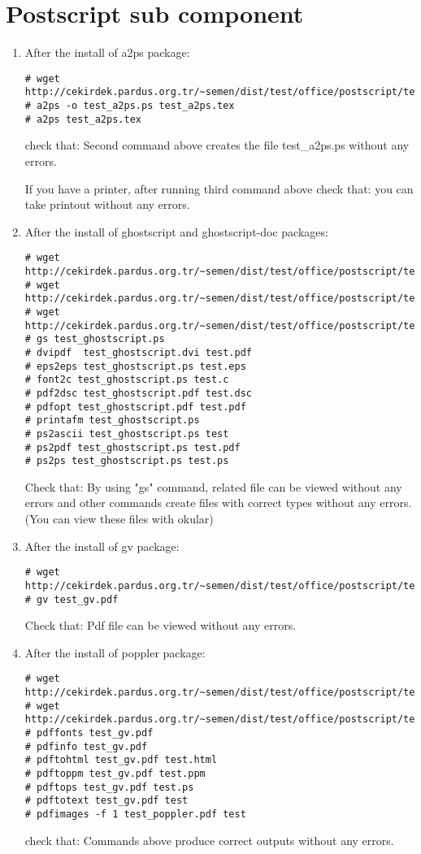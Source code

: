 \documentclass[a4paper,10pt]{article}
\begin{document}
\section{ Postscript sub component}
\begin{enumerate}
\item After the install of a2ps package:
\begin{verbatim}
# wget http://cekirdek.pardus.org.tr/~semen/dist/test/office/postscript/test_a2ps.tex
# a2ps -o test_a2ps.ps test_a2ps.tex
# a2ps test_a2ps.tex
\end{verbatim}

check that: Second command above creates the file test\_a2ps.ps without any errors.

If you have a printer, after running third command above  check that: you can take printout without any errors.

\item After the install of ghostscript and ghostscript-doc packages:
\begin{verbatim}
# wget http://cekirdek.pardus.org.tr/~semen/dist/test/office/postscript/test_ghostscript.ps
# wget http://cekirdek.pardus.org.tr/~semen/dist/test/office/postscript/test_ghostscript.dvi
# wget http://cekirdek.pardus.org.tr/~semen/dist/test/office/postscript/test_ghostscript.pdf
# gs test_ghostscript.ps
# dvipdf  test_ghostscript.dvi test.pdf
# eps2eps test_ghostscript.ps test.eps
# font2c test_ghostscript.ps test.c
# pdf2dsc test_ghostscript.pdf test.dsc
# pdfopt test_ghostscript.pdf test.pdf
# printafm test_ghostscript.ps
# ps2ascii test_ghostscript.ps test
# ps2pdf test_ghostscript.ps test.pdf
# ps2ps test_ghostscript.ps test.ps
\end{verbatim}

Check that: By using "gs" command, related file can be viewed without any errors and other commands create files with correct types without any errors. (You can view these files with okular)

\item After the install of gv package:
\begin{verbatim}
# wget http://cekirdek.pardus.org.tr/~semen/dist/test/office/postscript/test_gv.pdf
# gv test_gv.pdf
\end{verbatim}

Check that: Pdf file can be viewed without any errors.

\item After the install of poppler package:
\begin{verbatim}
# wget http://cekirdek.pardus.org.tr/~semen/dist/test/office/postscript/test_gv.pdf
# wget http://cekirdek.pardus.org.tr/~semen/dist/test/office/postscript/test_poppler.pdf
# pdffonts test_gv.pdf
# pdfinfo test_gv.pdf
# pdftohtml test_gv.pdf test.html
# pdftoppm test_gv.pdf test.ppm
# pdftops test_gv.pdf test.ps
# pdftotext test_gv.pdf test
# pdfimages -f 1 test_poppler.pdf test
\end{verbatim}

check that: Commands above produce correct outputs  without any errors.
\end{enumerate}
\end{document}
